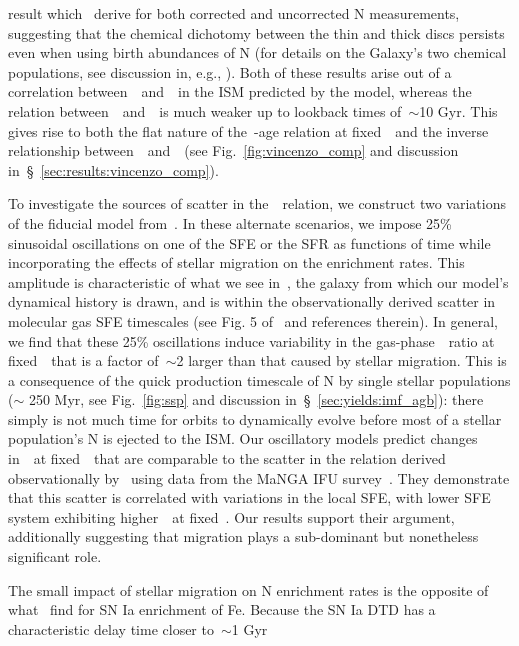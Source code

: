 \documentclass[ms.tex]{subfiles}
\begin{document}
result which~\citet{Vincenzo2021} derive for both corrected and uncorrected
N measurements, suggesting that the chemical dichotomy between the thin and
thick discs persists even when using birth abundances of N (for details on
the Galaxy's two chemical populations, see discussion in, e.g.,
\citealp{Hayden2015, Weinberg2019, Weinberg2021, Griffith2021b}).
Both of these results arise out of a correlation between~\nh~and~\feh~in the
ISM predicted by the model, whereas the relation between~\nh~and~\oh~is much
weaker up to lookback times of~$\sim$10 Gyr.
This gives rise to both the flat nature of the~\no-age relation at
fixed~\feh~and the inverse relationship between~\no~and~\ofe~(see
Fig.~\ref{fig:vincenzo_comp} and discussion
in~\S~\ref{sec:results:vincenzo_comp}).
\par
To investigate the sources of scatter in the~\ohno~relation, we construct two
variations of the fiducial model from~\citet{Johnson2021}.
In these alternate scenarios, we impose 25\% sinusoidal oscillations on one of
the SFE or the SFR as functions of time while incorporating the effects of
stellar migration on the enrichment rates.
This amplitude is characteristic of what we see in~\hsim, the galaxy from
which our model's dynamical history is drawn, and is within the
observationally derived scatter in molecular gas SFE timescales (see Fig. 5
of~\citealp{Tacconi2018} and references therein).
In general, we find that these 25\% oscillations induce variability in the
gas-phase~\no~ratio at fixed~\oh~that is a factor of~$\sim$2 larger than that
caused by stellar migration.
This is a consequence of the quick production timescale of N by single stellar
populations ($\sim$ 250 Myr, see Fig.~\ref{fig:ssp} and discussion
in~\S~\ref{sec:yields:imf_agb}): there simply is not much time for orbits to
dynamically evolve before most of a stellar population's N is ejected to the
ISM.
Our oscillatory models predict changes in~\no~at fixed~\oh~that are comparable
to the scatter in the relation derived observationally by~\citet{Schaefer2020}
using data from the MaNGA IFU survey~\citep{Bundy2015}.
They demonstrate that this scatter is correlated with variations in the local
SFE, with lower SFE system exhibiting higher~\no~at fixed~\oh.
Our results support their argument, additionally suggesting that migration
plays a sub-dominant but nonetheless significant role.
\par
The small impact of stellar migration on N enrichment rates is the opposite of
what~\citet{Johnson2021} find for SN Ia enrichment of Fe.
Because the SN Ia DTD has a characteristic delay time closer to~$\sim$1 Gyr
\end{document}
